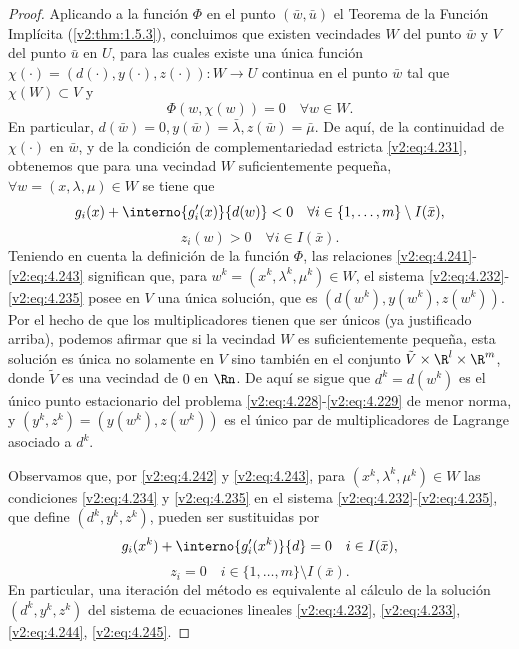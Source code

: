 \begin{proof}
Aplicando a la función $\Phi$ en el punto $(\bar{w}, \bar{u})$ el Teorema de la Función Implícita (\cref{v2:thm:1.5.3}), concluimos que existen vecindades $W$ del punto $\bar{w}$ y $V$ del punto $\bar{u}$ en $U$, para las cuales existe una única función $\chi(\cdot) = (d(\cdot), y(\cdot), z(\cdot)) \colon W \to U$ continua en el punto $\bar{w}$ tal que $\chi(W) \subset V$ y
\begin{equation}
\Phi(w, \chi(w)) = 0 \quad \forall w \in W.
\label{v2:eq:4.241}
\end{equation}
En particular, $d(\bar{w}) = 0, y(\bar{w}) = \bar{\lambda}, z(\bar{w}) = \bar{\mu}$. De aquí, de la continuidad de $\chi(\cdot)$ en $\bar{w}$, y de la condición de complementariedad estricta \eqref{v2:eq:4.231}, obtenemos que para una vecindad $W$ suficientemente pequeña, $\forall w = (x, \lambda, \mu) \in W$ se tiene que
\begin{equation}
g_i(x) + \interno{g'_i(x)}{d(w)} < 0 \quad \forall i \in \{ 1, \dots, m \} \setminus I(\bar{x}),
\label{v2:eq:4.242}
\end{equation}
\begin{equation}
z_i(w) > 0 \quad \forall i \in I(\bar{x}).
\label{v2:eq:4.243}
\end{equation}
Teniendo en cuenta la definición de la función $\Phi$, las relaciones \eqref{v2:eq:4.241}-\eqref{v2:eq:4.243} significan que, para $w^k = (x^k, \lambda^k, \mu^k) \in W$, el sistema \eqref{v2:eq:4.232}-\eqref{v2:eq:4.235} posee en $V$ una única solución, que es $(d(w^k), y(w^k), z(w^k))$. Por el hecho de que los multiplicadores tienen que ser únicos (ya justificado arriba), podemos afirmar que si la vecindad $W$ es suficientemente pequeña, esta solución es única no solamente en $V$ sino también en el conjunto $\tilde{V} \times \R^l \times \R^m$, donde $\tilde{V}$ es una vecindad de $0$ en $\Rn$. De aquí se sigue que $d^k = d(w^k)$ es el único punto estacionario del problema \eqref{v2:eq:4.228}-\eqref{v2:eq:4.229} de menor norma, y $(y^k, z^k) = (y(w^k), z(w^k))$ es el único par de multiplicadores de Lagrange asociado a $d^k$.

Observamos que, por \eqref{v2:eq:4.242} y \eqref{v2:eq:4.243}, para $(x^k, \lambda^k, \mu^k) \in W$ las condiciones \eqref{v2:eq:4.234} y \eqref{v2:eq:4.235} en el sistema \eqref{v2:eq:4.232}-\eqref{v2:eq:4.235}, que define $(d^k, y^k, z^k)$, pueden ser sustituidas por
\begin{equation}
g_i(x^k) + \interno{g'_i(x^k)}{d} = 0 \quad i \in I(\bar{x}),
\label{v2:eq:4.244}
\end{equation}
\begin{equation}
z_i = 0 \quad i \in \{ 1, \dots, m \} \setminus I(\bar{x}).
\label{v2:eq:4.245}
\end{equation}
En particular, una iteración del método es equivalente al cálculo de la solución $(d^k, y^k, z^k)$ del sistema de ecuaciones lineales \eqref{v2:eq:4.232}, \eqref{v2:eq:4.233}, \eqref{v2:eq:4.244}, \eqref{v2:eq:4.245}.


\end{proof}
